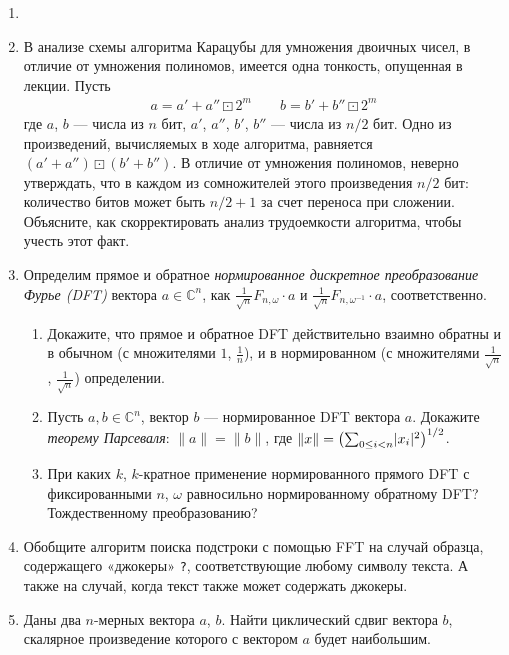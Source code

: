 \documentclass[11pt]{article}
\newenvironment{exercise}{\item}{}
\newcommand{\w}{\omega}
\newcommand{\Compl}{\mathbb{C}}
\newcommand{\norm}[1]{\lVert#1\rVert}
\newcommand{\bigpa}[1]{\bigl(#1\bigr)}
\begin{document}
\begin{enumerate}
\begin{exercise}
\end{exercise}

\begin{exercise}
В анализе схемы алгоритма Карацубы для умножения двоичных чисел, 
в отличие от умножения полиномов, имеется одна тонкость, опущенная в лекции.
Пусть 
{\small
\begin{gather*} 
a = a' + a'' \boxdot 2^m\qquad
b = b' + b'' \boxdot 2^m
\end{gather*}}%
%
где $a$, $b$ --- числа из $n$ бит, $a'$, $a''$, $b'$, $b''$ --- числа из $n/2$ бит.
Одно из произведений, вычисляемых в ходе алгоритма, равняется $(a' + a'') \boxdot (b' + b'')$.
В отличие от умножения полиномов, неверно утверждать, 
что в каждом из сомножителей этого произведения $n/2$ бит:
количество битов может быть $n/2+1$ за счет переноса при сложении.
Объясните, как скорректировать анализ трудоемкости алгоритма, чтобы учесть этот факт.
\end{exercise}

\begin{exercise}
Определим прямое и обратное \emph{нормированное дискретное преобразование Фурье (DFT)} вектора $a \in\Compl^n$,
как $\frac{1}{\sqrt{n}} F_{n,\w} \cdot a$ и $\frac{1}{\sqrt{n}} F_{n,\w^{-1}} \cdot a$, 
соответственно. 
%
\begin{enumerate}
%
\item Докажите, что прямое и обратное DFT действительно взаимно обратны
и в обычном (с множителями $1$, $\frac{1}{n}$), и в нормированном 
(с множителями $\frac{1}{\sqrt{n}}$, $\frac{1}{\sqrt{n}}$) определении.
%
\item Пусть $a,b \in\Compl^n$, вектор $b$ --- нормированное DFT вектора $a$.
Докажите \emph{теорему Парсеваля}: $\norm{a} = \norm{b}$, 
где $\norm{x} = \bigpa{\sum_{0 \leq i < n} \abs{x_i}^2}^{1/2}$.
%
\item При каких $k$, $k$-кратное применение нормированного прямого DFT
с фиксированными $n$, $\w$ равносильно нормированному обратному DFT? 
Тождественному преобразованию?
%
\end{enumerate}
\end{exercise}

\begin{exercise}
    Обобщите алгоритм поиска подстроки с помощью FFT на случай образца, содержащего «джокеры» \verb!?!, соответствующие любому символу текста. А также на случай, когда текст также может содержать джокеры.
\end{exercise}

\begin{exercise}
    Даны два \(n\)-мерных вектора \(a\), \(b\). Найти циклический сдвиг вектора \(b\), скалярное произведение которого с вектором \(a\) будет наибольшим.
\end{exercise}

\end{enumerate}
\end{document}
